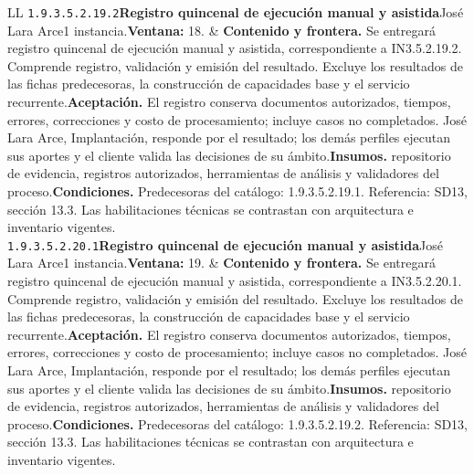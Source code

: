 \begin{longtable}{L{\tabcolsep\relax}L{\tabcolsep\relax}}
\texttt{1.\allowbreak{}9.\allowbreak{}3.\allowbreak{}5.\allowbreak{}2.\allowbreak{}19.\allowbreak{}2}\newline{}\textbf{Registro quincenal de ejecución manual y asistida}\newline{}José Lara Arce\newline{}1 instancia.\newline{}\textbf{Ventana:} 18. & \textbf{Contenido y frontera.} Se entregará registro quincenal de ejecución manual y asistida, correspondiente a IN3.5.2.19.2. Comprende registro, validación y emisión del resultado. Excluye los resultados de las fichas predecesoras, la construcción de capacidades base y el servicio recurrente.\newline{}\textbf{Aceptación.} El registro conserva documentos autorizados, tiempos, errores, correcciones y costo de procesamiento; incluye casos no completados. José Lara Arce, Implantación, responde por el resultado; los demás perfiles ejecutan sus aportes y el cliente valida las decisiones de su ámbito.\newline{}\textbf{Insumos.} repositorio de evidencia, registros autorizados, herramientas de análisis y validadores del proceso.\newline{}\textbf{Condiciones.} Predecesoras del catálogo: 1.9.3.5.2.19.1. Referencia: SD13, sección 13.3. Las habilitaciones técnicas se contrastan con arquitectura e inventario vigentes.\\\hline
\texttt{1.\allowbreak{}9.\allowbreak{}3.\allowbreak{}5.\allowbreak{}2.\allowbreak{}20.\allowbreak{}1}\newline{}\textbf{Registro quincenal de ejecución manual y asistida}\newline{}José Lara Arce\newline{}1 instancia.\newline{}\textbf{Ventana:} 19. & \textbf{Contenido y frontera.} Se entregará registro quincenal de ejecución manual y asistida, correspondiente a IN3.5.2.20.1. Comprende registro, validación y emisión del resultado. Excluye los resultados de las fichas predecesoras, la construcción de capacidades base y el servicio recurrente.\newline{}\textbf{Aceptación.} El registro conserva documentos autorizados, tiempos, errores, correcciones y costo de procesamiento; incluye casos no completados. José Lara Arce, Implantación, responde por el resultado; los demás perfiles ejecutan sus aportes y el cliente valida las decisiones de su ámbito.\newline{}\textbf{Insumos.} repositorio de evidencia, registros autorizados, herramientas de análisis y validadores del proceso.\newline{}\textbf{Condiciones.} Predecesoras del catálogo: 1.9.3.5.2.19.2. Referencia: SD13, sección 13.3. Las habilitaciones técnicas se contrastan con arquitectura e inventario vigentes.\\\hline

\end{longtable}
